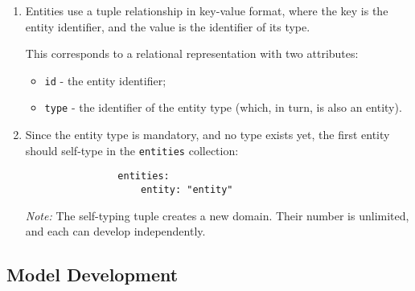 \documentclass[final]{article}
\begin{document}
            \begin{enumerate}

                \item Entities use a tuple relationship in key-value format, where the key is the entity identifier, and the value is the identifier of its type.

                This corresponds to a relational representation with two attributes:

                \begin{itemize}
                    \item \texttt{id} - the entity identifier;
                    \item \texttt{type} - the identifier of the entity type (which, in turn, is also an entity).
                \end{itemize}

                \item Since the entity type is mandatory, and no type exists yet, the first entity should self-type in the \texttt{entities} collection:

                \begin{verbatim}
                entities:
                    entity: "entity"
                \end{verbatim}


                \textit{Note:} The self-typing tuple creates a new domain. Their number is unlimited, and each can develop independently.

            \end{enumerate}

    \subsection{Model Development}
\end{document}
